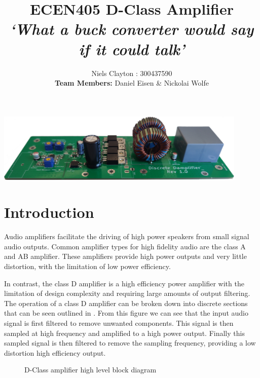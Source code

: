 \documentclass[a4paper,11pt]{article}
\begin{document}
\title{\LARGE{\textbf{ECEN405 D-Class Amplifier}}\\ \large{\textit{`What a buck converter would say if it could talk'}}}
\author{Niels Clayton : 300437590\\
\textbf{Team Members:} Daniel Eisen \& Nickolai Wolfe}
\date{}
\maketitle

\begin{center}
    \vspace{-20pt}
    \includegraphics[width=0.9\textwidth]{design.png}
\end{center}

\section{Introduction}

Audio amplifiers facilitate the driving of high power speakers from small signal audio outputs. Common amplifier types for high fidelity audio are the class A and AB amplifier. These amplifiers provide high power outputs and very little distortion, with the limitation of low power efficiency.

In contrast, the class D amplifier is a high efficiency power amplifier with the limitation of design complexity and requiring large amounts of output filtering.\\

The operation of a class D amplifier can be broken down into discrete sections that can be seen outlined in . From this figure we can see that the input audio signal is first filtered to remove unwanted components. This signal is then sampled at high frequency and amplified to a high power output. Finally this sampled signal is then filtered to remove the sampling frequency, providing a low distortion high efficiency output.

\begin{figure}[h!]
    \centering
    \caption{D-Class amplifier high level block diagram}
    \label{F:block}
\end{figure}
\end{document}
